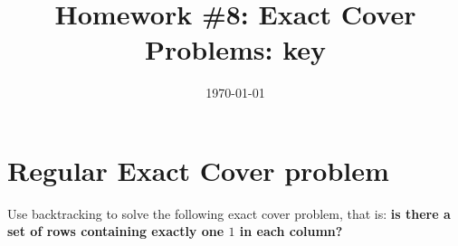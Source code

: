 \documentclass[table]{article}
\title{Homework \#8: Exact Cover Problems: key}
\date{\today}
\begin{document}
\maketitle

\section{Regular Exact Cover problem}

Use backtracking to solve the following exact cover problem, that is: {\bf is there a set of rows containing exactly one $1$ in each column?}
\vspace{1em}

%
%	
%
\vspace{2em}
\end{document}
